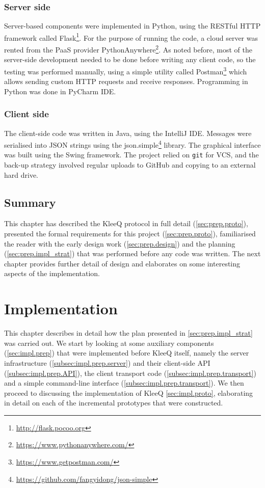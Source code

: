 \documentclass[a4paper, 12pt]{report}
\begin{document}
\subsection{Server side}
Server-based components were implemented in Python, using the RESTful HTTP framework called Flask\footnote{\url{http://flask.pocoo.org}}. For the purpose of running the code, a cloud server was rented from the PaaS provider PythonAnywhere\footnote{\url{https://www.pythonanywhere.com/}}. As noted before, most of the server-side development needed to be done before writing any client code, so the testing was performed manually, using a simple utility called Postman\footnote{\url{https://www.getpostman.com/}} which allows sending custom HTTP requests and receive responses. Programming in Python was done in PyCharm IDE.

\subsection{Client side}
The client-side code was written in Java, using the IntelliJ IDE. Messages were serialised into JSON strings using the json.simple\footnote{\url{https://github.com/fangyidong/json-simple}} library. The graphical interface was built using the Swing framework. The project relied on \texttt{git} for VCS, and the back-up strategy involved regular uploads to GitHub and copying to an external hard drive.

\section{Summary}
This chapter has described the KleeQ protocol in full detail (\cref{sec:prep.proto}), presented the formal requirements for this project (\cref{sec:prep.proto}), familiarised the reader with the early design work (\cref{sec:prep.design}) and the planning (\cref{sec:prep.impl_strat}) that was performed before any code was written. The next chapter provides further detail of design and elaborates on some interesting aspects of the implementation.



\chapter{Implementation}
This chapter describes in detail how the plan presented in \cref{sec:prep.impl_strat} was carried out. We start by looking at some auxiliary components (\cref{sec:impl.prep}) that were implemented before KleeQ itself, namely the server infrastructure (\cref{subsec:impl.prep.server}) and their client-side API (\cref{subsec:impl.prep.API}), the client transport code (\cref{subsec:impl.prep.transport}) and a simple command-line interface (\cref{subsec:impl.prep.transport}). We then proceed to discussing the implementation of KleeQ \cref{sec:impl.proto}, elaborating in detail on each of the incremental prototypes that were constructed.
\end{document}
